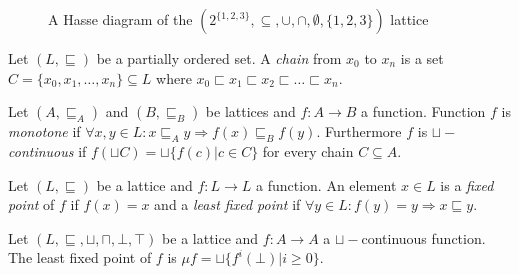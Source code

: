 \begin{figure}[H]
    \centering
    \caption{A Hasse diagram of the $(2^{\{1,2,3\}}, \subseteq, \cup, \cap, \emptyset, \{1,2,3\})$ lattice}
    \label{fig_hasse_diag}
\end{figure}

\begin{defn}
Let $(L, \sqsubseteq)$ be a partially ordered set. A \emph{chain} from $x_0$ to $x_n$ is a set $C = \{x_0, x_1, \dots, x_n\} \subseteq L$ where $x_0 \sqsubset x_1 \sqsubset x_2 \sqsubset \dots \sqsubset x_n$. 
\end{defn}

\begin{defn}
Let $(A, \sqsubseteq_A)$ and $(B, \sqsubseteq_B)$ be lattices and $f: A \rightarrow B$ a function. Function $f$ is \emph{monotone} if $\forall x, y \in L: x \sqsubseteq_A y \Rightarrow f(x) \sqsubseteq_B f(y)$. Furthermore $f$ is \emph{$\sqcup-$continuous} if $f(\sqcup C) = \sqcup\{f(c) | c \in C\}$ for every chain $C \subseteq A$.
\end{defn}

\begin{defn}
Let $(L, \sqsubseteq)$ be a lattice and $f: L \rightarrow L$ a function. An element $x \in L$ is a \emph{fixed point} of $f$ if $f(x) = x$ and a \emph{least fixed point} if $\forall y \in L: f(y) = y \Rightarrow x \sqsubseteq y$.
\end{defn}

\begin{thm}
Let $(L, \sqsubseteq, \sqcup, \sqcap, \bot, \top)$ be a lattice and $f: A \rightarrow A$ a $\sqcup-$continuous function. The least fixed point of $f$ is $\mu f = \sqcup\{f^i(\bot)|i \geq 0\}$.
\end{thm}

